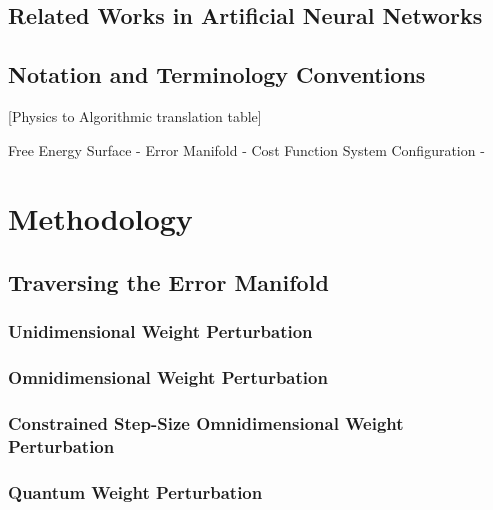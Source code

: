 \documentclass[11pt]{afthesis}
\begin{document}

\section{Related Works in Artificial Neural Networks}


\section{Notation and Terminology Conventions}

[Physics to Algorithmic translation table]

Free Energy Surface - Error Manifold - Cost Function
System Configuration -  

\chapter{Methodology}

\section{Traversing the Error Manifold}

\subsection{Unidimensional Weight Perturbation}

\subsection{Omnidimensional Weight Perturbation}

\subsection{Constrained Step-Size Omnidimensional Weight Perturbation}

\subsection{Quantum Weight Perturbation}
\end{document}
